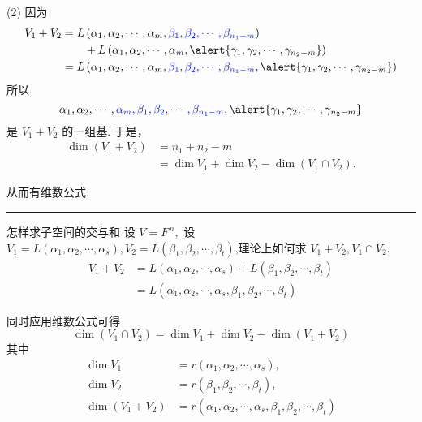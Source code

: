 \documentclass[13pt]{beamer}
\def\qed{\nopagebreak\hfill{\rule{4pt}{7pt}}\medbreak}
\newcommand{\blue}{\textcolor{blue}}
\begin{document}
\begin{frame}
(2) 
因为
\begin{align*}
V_{1}+V_{2}& =L\left(\alpha_{1}, \alpha_{2}, \cdots, \alpha_{m}, \blue{\beta_{1}, \beta_{2}, \cdots, \beta_{n_{1}-m}}\right)\\
& \qquad +L\left(\alpha_{1}, \alpha_{2}, \cdots, \alpha_{m}, \alert{\gamma_{1}, \gamma_{2}, \cdots, \gamma_{n_{2}-m}}\right)\\
& =L\left(\alpha_{1}, \alpha_{2}, \cdots, \alpha_{m}, \blue{\beta_{1}, \beta_{2}, \cdots, \beta_{n_{1}-m}}, \alert{\gamma_{1}, \gamma_{2}, \cdots, \gamma_{n_{2}-m}}\right)
\end{align*}
所以 $$\alpha_{1}, \alpha_{2}, \cdots, 
\blue{\alpha_{m}, \beta_{1}, \beta_{2}, \cdots, \beta_{n_{1}-m}}, 
\alert{\gamma_{1}, \gamma_{2}, \cdots, \gamma_{n_{2}-m}}$$ 
是 $V_{1}+V_{2}$ 的一组基.
于是，  
\begin{align*}
\operatorname{dim}\left(V_{1}+V_{2}\right)& = n_1+n_2-m\\
&=\operatorname{dim} V_{1}+\operatorname{dim} V_{2}-\operatorname{dim}\left(V_{1} \cap V_{2}\right).
\end{align*}


从而有维数公式. \qed
\end{frame}


\begin{frame}{怎样求子空间的交与和}
设 $V=F^{\,n},$ 设 $V_{1}=L\left(\alpha_{1}, \alpha_{2}, \cdots, \alpha_{s}\right), V_{2}=L\left(\beta_{1}, \beta_{2}, \cdots, \beta_{t}\right)$,理论上如何求 $V_{1}+V_{2}, V_{1} \cap V_{2}$.
\begin{align*}
V_{1}+V_{2} & =L\left(\alpha_{1}, \alpha_{2}, \cdots, \alpha_{s}\right)+L\left(\beta_{1}, \beta_{2}, \cdots, \beta_{t}\right)\\
& =L\left(\alpha_{1}, \alpha_{2}, \cdots, \alpha_{s}, \beta_{1}, \beta_{2}, \cdots, \beta_{t}\right)
\end{align*}

同时应用维数公式可得 $$\operatorname{dim}\left(V_{1} \cap V_{2}\right)=\operatorname{dim} V_{1}+\operatorname{dim} V_{2}-\operatorname{dim}\left(V_{1}+V_{2}\right)$$
其中
\begin{align*}
\operatorname{dim} V_{1}& =r\left(\alpha_{1}, \alpha_{2}, \cdots, \alpha_{s}\right),\\
 \operatorname{dim} V_{2}& =r\left(\beta_{1}, \beta_{2}, \cdots, \beta_{t}\right),\\ \operatorname{dim}\left(V_{1}+V_{2}\right) & =r\left(\alpha_{1}, \alpha_{2}, \cdots, \alpha_{s}, \beta_{1}, \beta_{2}, \cdots, \beta_{t}\right)
\end{align*}
\end{frame}
\end{document}
